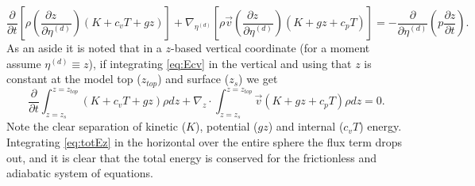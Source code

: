 \documentclass{agujournal}
\begin{document}
\begin{equation}
\frac{\partial }{\partial t}\left[ \rho \left( \frac{\partial z\quad }{\partial \eta^{(d)}}\right)\left(K+c_vT+gz\right)\right]+\nabla_{\eta^{(d)}} \left[ \rho \vec{v} \left( \frac{\partial z\quad }{\partial \eta^{(d)}}\right) \left( K+gz+c_pT \right) \right]=-\frac{\partial}{\partial \eta^{(d)}}\left( p\frac{\partial z}{\partial t}\right).\label{eq:Ecv}
\end{equation}
As an aside it is noted that in a $z$-based vertical coordinate (for a moment assume $\eta^{(d)}\equiv z$), if integrating \eqref{eq:Ecv} in the vertical and using that $z$ is constant at the model top ($z_{top}$) and surface ($z_s$) we get
\begin{equation}
\frac{\partial }{\partial t}\int_{z=z_s}^{z=z_{top}}\left(K+c_vT+gz\right)\rho dz+\nabla_z \cdot \int_{z=z_s}^{z=z_{top}} \vec{v} \left( K+gz+c_pT \right) \rho dz=0.\label{eq:totEz}
\end{equation}
Note the clear separation of kinetic ($K$), potential ($gz$) and internal ($c_vT$) energy. Integrating \eqref{eq:totEz} in the horizontal over the entire sphere the flux term drops out, and it is clear that the total energy is conserved for the frictionless and adiabatic system of equations.
\end{document}
